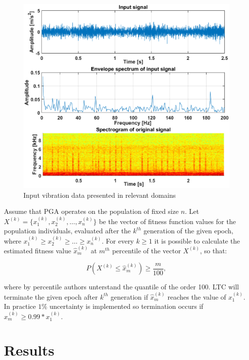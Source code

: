 \documentclass{svproc}
\begin{document}
\begin{figure}[ht!]
\centering
\includegraphics[width=\textwidth]{figs/raw.eps}
\caption{Input vibration data presented in relevant domains}
\label{fig:raw}
\end{figure}

Assume that PGA operates on the population of fixed size $n$. Let $X^{(k)}=\{x^{(k)}_1,x^{(k)}_2,\dots ,x^{(k)}_n\}$ be the vector of fitness function values for the population individuals, evaluated after the $k^{th}$ generation of the given epoch, where $x^{(k)}_1\geq x^{(k)}_2\geq \dots \geq x^{(k)}_n$. For every $k\geq 1$ it is possible to calculate the estimated fitness value $\hat{x}^{(k)}_m$ at $m^{th}$ percentile of the vector $X^{(k)}$, so that:

\begin{equation}
    P\left( X^{(k)}\leq\hat{x}^{(k)}_m \right)\geq \frac{m}{100},
\end{equation}

where by percentile authors unterstand the quantile of the order 100. LTC will terminate the given epoch after $k^{th}$ generation if $\hat{x}^{(k)}_m$ reaches the value of $x^{(k)}_1$. In practice $1\%$ uncertainty is implemented so termination occurs if  $\hat{x}^{(k)}_m\geq 0.99*x^{(k)}_1$.


\section{Results}\label{res}
\end{document}
